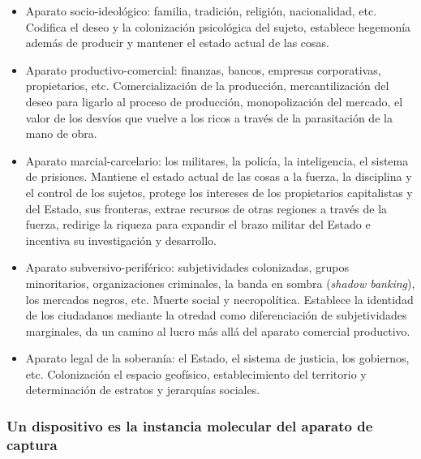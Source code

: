 \documentclass[
]{article}
\begin{document}
\begin{itemize}
\item
  Aparato socio-ideológico: familia, tradición, religión, nacionalidad,
  etc. Codifica el deseo y la colonización psicológica del sujeto,
  establece hegemonía además de producir y mantener el estado actual de
  las cosas.
\item
  Aparato productivo-comercial: finanzas, bancos, empresas corporativas,
  propietarios, etc. Comercialización de la producción, mercantilización
  del deseo para ligarlo al proceso de producción, monopolización del
  mercado, el valor de los desvíos que vuelve a los ricos a través de la
  parasitación de la mano de obra.
\item
  Aparato marcial-carcelario: los militares, la policía, la
  inteligencia, el sistema de prisiones. Mantiene el estado actual de
  las cosas a la fuerza, la disciplina y el control de los sujetos,
  protege los intereses de los propietarios capitalistas y del Estado,
  sus fronteras, extrae recursos de otras regiones a través de la
  fuerza, redirige la riqueza para expandir el brazo militar del Estado
  e incentiva su investigación y desarrollo.
\item
  Aparato subversivo-periférico: subjetividades colonizadas, grupos
  minoritarios, organizaciones criminales, la banda en sombra
  (\emph{shadow banking}), los mercados negros, etc. Muerte social y
  necropolítica. Establece la identidad de los ciudadanos mediante la
  otredad como diferenciación de subjetividades marginales, da un camino
  al lucro más allá del aparato comercial productivo.
\item
  Aparato legal de la soberanía: el Estado, el sistema de justicia, los
  gobiernos, etc. Colonización el espacio geofísico, establecimiento del
  territorio y determinación de estratos y jerarquías sociales.
\end{itemize}

\hypertarget{un-dispositivo-es-la-instancia-molecular-del-aparato-de-captura}{%
\subsubsection{Un dispositivo es la instancia molecular del aparato de
captura}\label{un-dispositivo-es-la-instancia-molecular-del-aparato-de-captura}}
\end{document}
